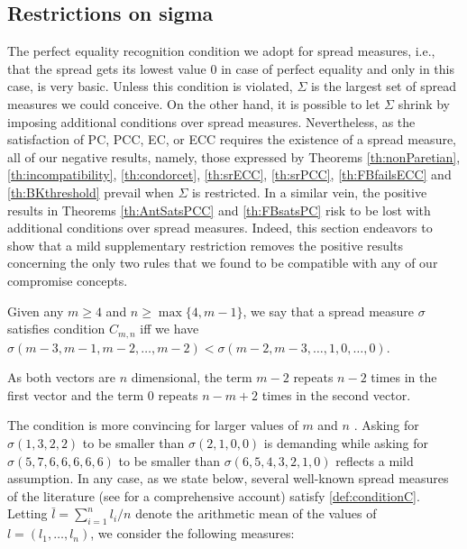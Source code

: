 \documentclass[version=3.21, pagesize, twoside=off, bibliography=totoc, DIV=calc, fontsize=12pt, a4paper]{scrartcl}
\begin{document}
\subsection{Restrictions on sigma}
\label{sec:RestrictionOnSigma}
The perfect equality recognition condition we adopt for spread measures, i.e., that the spread gets its lowest value $0$ in case of perfect equality and only in this case, is very basic. Unless this condition is violated, $\Sigma$ is the largest set of spread measures we could conceive. On the other hand, it is possible to let $\Sigma$ shrink by imposing additional conditions over spread measures. Nevertheless, as the satisfaction of PC, PCC, EC, or ECC requires the existence of a spread measure, all of our negative results, namely, those expressed by Theorems \ref{th:nonParetian}, \ref{th:incompatibility}, \ref{th:condorcet}, \ref{th:srECC}, \ref{th:srPCC}, \ref{th:FBfailsECC} and \ref{th:BKthreshold} prevail when $\Sigma$ is restricted. In a similar vein, the positive results in Theorems \ref{th:AntSatsPCC} and \ref{th:FBsatsPC} risk to be lost with additional conditions over spread measures.
Indeed, this section endeavors to show that a mild supplementary restriction removes the positive results concerning the only two rules that we found to be compatible with any of our compromise concepts. 

\begin{definition}
	\label{def:conditionC}
	Given any $m\geq4$ and $n\geq \max\{4,m-1\}$, we say that a spread measure $\sigma$ satisfies condition $C_{m,n}$ iff we have $\sigma(m-3, m-1, m-2, \dots, m-2) < \sigma(m-2, m-3, \dots, 1, 0, \dots, 0)$.
\end{definition}

As both vectors are $n$ dimensional, the term $m-2$ repeats $n-2$ times in the first vector and the term $0$ repeats $n-m+2$ times in the second vector.

The condition is more convincing for larger values of $m$ and $n$ . Asking for $\sigma(1,3,2,2)$ to be smaller than $\sigma(2,1,0,0)$ is demanding while asking for $\sigma(5,7,6,6,6,6,6)$ to be smaller than $\sigma(6,5,4,3,2,1,0)$ reflects a mild assumption. In any case, as we state below, several well-known spread measures of the literature (see \citet{Allison1978} for a comprehensive account) satisfy \cref{def:conditionC}. Letting $\bar{l} = \sum_{i=1}^{n} l_i / n$ denote the arithmetic mean of the values of $l = (l_1, …, l_n)$, we consider the following measures:
\end{document}

